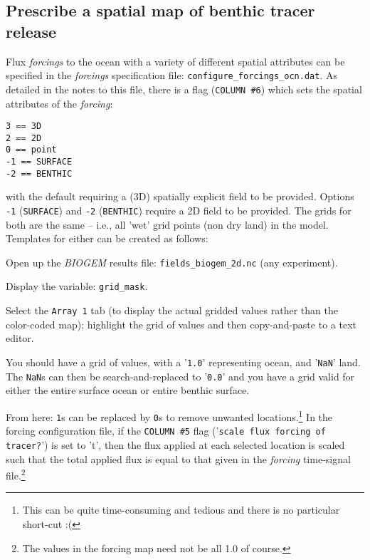 \documentclass[10pt,twoside]{article}
\begin{document}

\subsection{Prescribe a spatial map of benthic tracer release}\label{Prescribe a spatial map of benthic tracer release}

Flux \textit{forcings} to the ocean with a variety of different spatial attributes can be specified in the \textit{forcings} specification file: \texttt{configure\_forcings\_ocn.dat}. As detailed in the notes to this file, there is a flag (\texttt{COLUMN \#6}) which sets the spatial attributes of the \textit{forcing}: 
\vspace{-10pt}\begin{verbatim}
3 == 3D
2 == 2D
0 == point
-1 == SURFACE
-2 == BENTHIC
\end{verbatim}\vspace{-10pt}
with the default requiring a (3D) spatially explicit field to be provided.
Options \texttt{-1} (\texttt{SURFACE}) and \texttt{-2} (\texttt{BENTHIC}) require a 2D field to be provided. The grids for both are the same -- i.e., all 'wet' grid points (non dry land) in the model.
Templates for either can be created as follows:
\begin{compactenum}
\item Open up the \textit{BIOGEM} results file: \texttt{fields\_biogem\_2d.nc} (any experiment).
\item Display the variable: \texttt{grid\_mask}.
\item Select the \texttt{Array 1} tab (to display the actual gridded values rather than the color-coded map); highlight the grid of values and then copy-and-paste to a text editor.
\item You should have a grid of values, with a '\texttt{1.0}' representing ocean, and '\texttt{NaN}' land. The \texttt{NaN}s can then be search-and-replaced to '\texttt{0.0}' and you have a grid valid for either the entire surface ocean or entire benthic surface.
\end{compactenum}
From here: \texttt{1}s can be replaced by \texttt{0}s to remove unwanted locations.\footnote{This can be quite time-consuming and tedious and there is no particular short-cut :(}
In the forcing configuration file, if the \texttt{COLUMN \#5} flag ('\texttt{scale flux forcing of tracer?}') is set to 't', then the flux applied at each selected location is scaled such that the total applied flux is equal to that given in the \textit{forcing} time-signal file.\footnote{The values in the forcing map need not be all 1.0 of course.}
\end{document}
